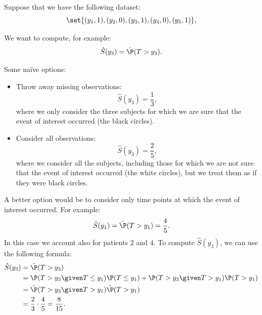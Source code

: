 Suppose that we have the following dataset:
\begin{equation}
    \set{(y_1, 1), (y_2, 0), (y_3, 1), (y_4, 0), (y_5, 1)},
\end{equation}

We want to compute, for example:
\begin{equation}
    \hat{S}(y_3) = \hat{\P}(T > y_3).
\end{equation}

Some na\"ive options:
\begin{itemize}[beginpenalty=10000]
    \item Throw away missing observations:
          \begin{equation}
              \hat{S}(y_3) = \frac{1}{3},
          \end{equation}
          where we only consider the three subjects for which we are sure that the event of interest occurred (the black circles).
    \item Consider all observations:
          \begin{equation}
              \hat{S}(y_3) = \frac{2}{5},
          \end{equation}
          where we consider all the subjects, including those for which we are not sure that the event of interest occurred (the white circles), but we treat them as if they were black circles.
\end{itemize}
A better option would be to consider only time points at which the event of interest occurred. For example:
\begin{equation}
    \hat{S}(y_1) = \hat{\P}(T > y_1) = \frac{4}{5}.
\end{equation}
In this case we account also for patients $2$ and $4$. To compute $\hat{S}(y_3)$, we can use the following formula:
\begin{equation}
    \begin{aligned}
        \hat{S}(y_3) & = \hat{\P}(T > y_3)                                                                     \\
                     & = \P(T > y_3 \given T \leq y_1) \P(T \leq y_1) + \P(T > y_3 \given T > y_1) \P(T > y_1) \\
                     & = \hat{\P}(T > y_3 \given T > y_1) \hat{\P}(T > y_1)                                    \\
                     & = \frac{2}{3}\cdot \frac{4}{5} = \frac{8}{15}.
    \end{aligned}
\end{equation}
